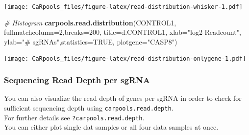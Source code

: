 \documentclass[]{article}
\newenvironment{Shaded}{\begin{snugshade}}{\end{snugshade}}
\newcommand{\KeywordTok}[1]{\textcolor[rgb]{0.13,0.29,0.53}{\textbf{{#1}}}}
\newcommand{\DataTypeTok}[1]{\textcolor[rgb]{0.13,0.29,0.53}{{#1}}}
\newcommand{\DecValTok}[1]{\textcolor[rgb]{0.00,0.00,0.81}{{#1}}}
\newcommand{\StringTok}[1]{\textcolor[rgb]{0.31,0.60,0.02}{{#1}}}
\newcommand{\CommentTok}[1]{\textcolor[rgb]{0.56,0.35,0.01}{\textit{{#1}}}}
\newcommand{\OtherTok}[1]{\textcolor[rgb]{0.56,0.35,0.01}{{#1}}}
\newcommand{\NormalTok}[1]{{#1}}
\begin{document}
\texttt{[image: CaRpools\_files/figure-latex/read-distribution-whisker-1.pdf]}

\begin{Shaded}
\begin{Highlighting}[]
\CommentTok{# Histogram}
\KeywordTok{carpools.read.distribution}\NormalTok{(CONTROL1, }\DataTypeTok{fullmatchcolumn=}\DecValTok{2}\NormalTok{,}\DataTypeTok{breaks=}\DecValTok{200}\NormalTok{,}
  \DataTypeTok{title=}\NormalTok{d.CONTROL1, }\DataTypeTok{xlab=}\StringTok{"log2 Readcount"}\NormalTok{, }\DataTypeTok{ylab=}\StringTok{"# sgRNAs"}\NormalTok{,}\DataTypeTok{statistics=}\OtherTok{TRUE}\NormalTok{, }\DataTypeTok{plotgene=}\StringTok{"CASP8"}\NormalTok{) }
\end{Highlighting}
\end{Shaded}

\texttt{[image: CaRpools\_files/figure-latex/read-distribution-onlygene-1.pdf]}

\subsubsection{Sequencing Read Depth per
sgRNA}\label{sequencing-read-depth-per-sgrna}

You can also visualize the read depth of genes per sgRNA in order to
check for sufficient sequencing depth using
\texttt{carpools.read.depth}.\\
For further details see \texttt{?carpools.read.depth}.\\
You can either plot single dat samples or all four data samples at once.
\end{document}
